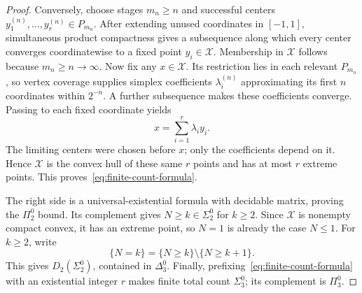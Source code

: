 \begin{proof}
Conversely, choose stages \(m_n\ge n\) and successful centers
\(y_1^{(n)},\ldots,y_r^{(n)}\in P_{m_n}\).
After extending unused coordinates in \([-1,1]\), simultaneous
product compactness gives a subsequence along which every center
converges coordinatewise to a fixed point \(y_i\in \mathcal X\).
Membership in \(\mathcal X\) follows because \(m_n\ge n\to\infty\).
Now fix any \(x\in \mathcal X\).  Its restriction lies in each relevant
\(P_{m_n}\), so vertex coverage supplies simplex coefficients
\(\lambda_i^{(n)}\) approximating its first \(n\) coordinates
within \(2^{-n}\).  A further subsequence makes these coefficients
converge.  Passing to each fixed coordinate yields
\[
 x=\sum_{i=1}^r\lambda_i y_i.
\]
The limiting centers were chosen before \(x\); only the
coefficients depend on it.  Hence \(\mathcal X\) is the convex hull of
these same \(r\) points and has at most \(r\) extreme points.
This proves~\eqref{eq:finite-count-formula}.

The right side is a universal-existential formula with decidable
matrix, proving the \(\Pi^0_2\) bound.  Its complement gives
\(N\ge k\in\Sigma^0_2\) for \(k\ge2\).  Since \(\mathcal X\) is
nonempty compact convex, it has an extreme point, so \(N=1\) is
already the case \(N\le1\).  For \(k\ge2\), write
\[
 \{N=k\}=\{N\ge k\}\setminus\{N\ge k+1\}.
\]
This gives \(D_2(\Sigma^0_2)\), contained in \(\Delta^0_3\).
Finally, prefixing~\eqref{eq:finite-count-formula} with an
existential integer \(r\) makes finite total count \(\Sigma^0_3\);
its complement is \(\Pi^0_3\).
\end{proof}




